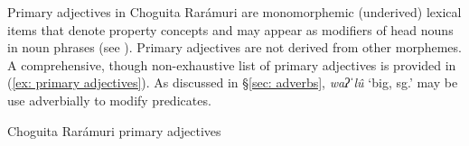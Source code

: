 Primary adjectives in Choguita Rarámuri are monomorphemic (underived) lexical items that denote property concepts and may appear as modifiers of head nouns in noun phrases (see ). Primary adjectives are not derived from other morphemes. A comprehensive, though non-exhaustive list of primary adjectives is provided in (\ref{ex: primary adjectives}). As discussed in §\ref{sec: adverbs}, \textit{waʔˈlû} `big, sg.' may be use adverbially to modify predicates.

\ea\label{ex: primary adjectives}
{Choguita Rarámuri primary adjectives}

    \z
\z

